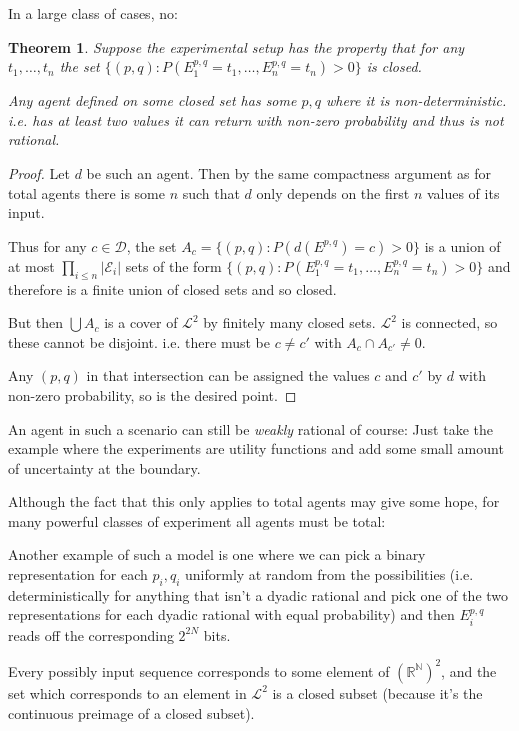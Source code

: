 \documentclass[a4paper]{book}
\newtheorem{theorem}{Theorem}[section]
\begin{document}
In a large class of cases, no:

\begin{theorem}
Suppose the experimental setup has the property that for any $t_1, \ldots, t_n$
the set $\{(p, q): P(E^{p, q}_1 = t_1, \ldots, E^{p, q}_n = t_n) > 0\}$
is closed.

Any agent defined on some closed set has some $p, q$ where it is non-deterministic.
i.e. has at least two values it can return with non-zero probability and thus is
not rational.
\end{theorem}

\begin{proof}
Let $d$ be such an agent. Then by the same compactness argument as for total
agents there is some $n$ such that $d$ only depends on the first $n$ values of its input.

Thus for any $c \in \mathcal{D}$,
the set $A_c = \{(p, q): P(d(E^{p, q}) = c) > 0\}$
is a union of at most $\prod\limits_{i \leq n} |\mathcal{E}_i|$
sets of the form $\{(p, q): P(E^{p, q}_1 = t_1, \ldots, E^{p, q}_n = t_n) > 0\}$
and therefore is a finite union of closed sets and so closed.

But then $\bigcup A_c$
is a cover of $\mathcal{L}^2$
by finitely many closed sets. $\mathcal{L}^2$
is connected, so these cannot be disjoint. i.e. there must be $c \neq c'$ 
with $A_c \cap A_{c'} \neq 0$.

Any $(p, q)$
in that intersection can be assigned the values $c$ and $c'$
by $d$
with non-zero probability, so is the desired point.
\end{proof}

An agent in such a scenario can still be \textit{weakly} rational of course:
Just take the example where the experiments are utility functions and add some
small amount of uncertainty at the boundary.

Although the fact that this only applies to total agents may give some hope,
for many powerful classes of experiment all agents must be total:

Another example of such a model is one where we can pick a binary representation for
each $p_i, q_i$
uniformly at random from the possibilities (i.e. deterministically for anything
that isn't a dyadic rational and pick one of the two representations for each
dyadic rational with equal probability) and then $E^{p, q}_i$ reads off the
corresponding $2^{2N}$
bits.

Every possibly input sequence corresponds to some element of $(\mathbb{R^N})^2$,
and the set which corresponds to an element in $\mathcal{L}^2$
is a closed subset (because it's the continuous preimage of a closed subset).
\end{document}
